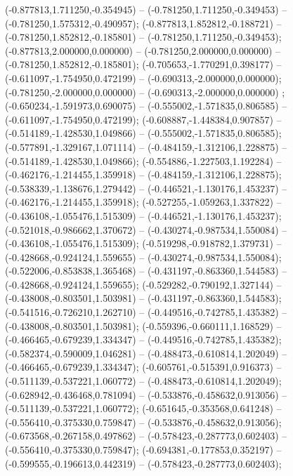  (-0.877813,1.711250,-0.354945) -- (-0.781250,1.711250,-0.349453) -- (-0.781250,1.575312,-0.490957);
 (-0.877813,1.852812,-0.188721) -- (-0.781250,1.852812,-0.185801) -- (-0.781250,1.711250,-0.349453);
 (-0.877813,2.000000,0.000000) -- (-0.781250,2.000000,0.000000) -- (-0.781250,1.852812,-0.185801);
 (-0.705653,-1.770291,0.398177) -- (-0.611097,-1.754950,0.472199) -- (-0.690313,-2.000000,0.000000);
 (-0.781250,-2.000000,0.000000) -- (-0.690313,-2.000000,0.000000) ;
 (-0.650234,-1.591973,0.690075) -- (-0.555002,-1.571835,0.806585) -- (-0.611097,-1.754950,0.472199);
 (-0.608887,-1.448384,0.907857) -- (-0.514189,-1.428530,1.049866) -- (-0.555002,-1.571835,0.806585);
 (-0.577891,-1.329167,1.071114) -- (-0.484159,-1.312106,1.228875) -- (-0.514189,-1.428530,1.049866);
 (-0.554886,-1.227503,1.192284) -- (-0.462176,-1.214455,1.359918) -- (-0.484159,-1.312106,1.228875);
 (-0.538339,-1.138676,1.279442) -- (-0.446521,-1.130176,1.453237) -- (-0.462176,-1.214455,1.359918);
 (-0.527255,-1.059263,1.337822) -- (-0.436108,-1.055476,1.515309) -- (-0.446521,-1.130176,1.453237);
 (-0.521018,-0.986662,1.370672) -- (-0.430274,-0.987534,1.550084) -- (-0.436108,-1.055476,1.515309);
 (-0.519298,-0.918782,1.379731) -- (-0.428668,-0.924124,1.559655) -- (-0.430274,-0.987534,1.550084);
 (-0.522006,-0.853838,1.365468) -- (-0.431197,-0.863360,1.544583) -- (-0.428668,-0.924124,1.559655);
 (-0.529282,-0.790192,1.327144) -- (-0.438008,-0.803501,1.503981) -- (-0.431197,-0.863360,1.544583);
 (-0.541516,-0.726210,1.262710) -- (-0.449516,-0.742785,1.435382) -- (-0.438008,-0.803501,1.503981);
 (-0.559396,-0.660111,1.168529) -- (-0.466465,-0.679239,1.334347) -- (-0.449516,-0.742785,1.435382);
 (-0.582374,-0.590009,1.046281) -- (-0.488473,-0.610814,1.202049) -- (-0.466465,-0.679239,1.334347);
 (-0.605761,-0.515391,0.916373) -- (-0.511139,-0.537221,1.060772) -- (-0.488473,-0.610814,1.202049);
 (-0.628942,-0.436468,0.781094) -- (-0.533876,-0.458632,0.913056) -- (-0.511139,-0.537221,1.060772);
 (-0.651645,-0.353568,0.641248) -- (-0.556410,-0.375330,0.759847) -- (-0.533876,-0.458632,0.913056);
 (-0.673568,-0.267158,0.497862) -- (-0.578423,-0.287773,0.602403) -- (-0.556410,-0.375330,0.759847);
 (-0.694381,-0.177853,0.352197) -- (-0.599555,-0.196613,0.442319) -- (-0.578423,-0.287773,0.602403);
